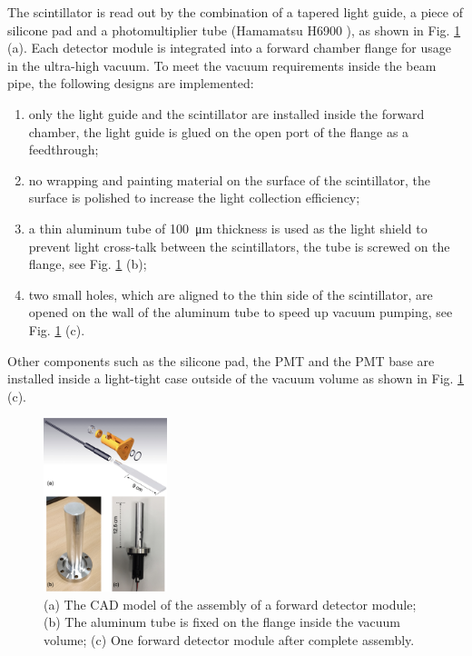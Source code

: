 \documentclass[number,5p]{elsarticle}
\begin{document}
The scintillator is read out by the combination of a tapered light guide, a piece of silicone pad and a
photomultiplier tube (Hamamatsu H6900 \cite{hamamatsu}), as shown in Fig. \ref{fig:forward_module} (a).
Each detector module is integrated into a forward chamber flange for usage
in the ultra-high vacuum.
To meet the vacuum requirements inside the beam pipe, the following designs are implemented:
\begin{enumerate}
\item only the light guide and the scintillator are installed inside the forward chamber, the light guide is glued on the open port of the flange as a feedthrough;
\item no wrapping and painting material on the surface of the scintillator, the
  surface is polished to increase the light collection efficiency;
\item a thin aluminum tube of \SI{100}{\micro\meter} thickness is used as
  the light shield to prevent light cross-talk between the scintillators, the tube is screwed on the flange, see Fig. \ref{fig:forward_module} (b);
\item two small holes, which are aligned to the thin side of the scintillator, are opened on the wall of the aluminum tube to speed up vacuum pumping, see Fig. \ref{fig:forward_module} (c).
\end{enumerate}
Other components such as the silicone pad, the PMT and the PMT base are
installed inside a light-tight case outside of the vacuum volume as shown in Fig. \ref{fig:forward_module} (c).
\begin{figure}[htbp]
  \centering
  \includegraphics[width=0.32\textwidth]{./forward_module.png}
  \caption{(a) The CAD model of the assembly of a forward detector module; (b) The
    aluminum tube is fixed on the flange inside the vacuum volume; (c) One forward detector module after complete assembly.}
  \label{fig:forward_module}
\end{figure}
\end{document}
